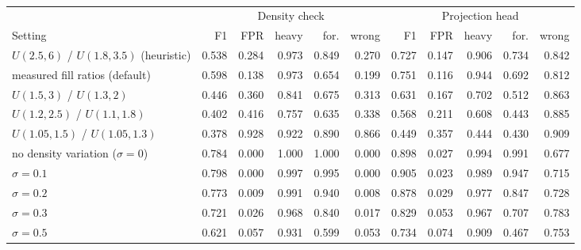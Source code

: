 \begin{table}[tb]
\centering
\caption{}
\label{tab:sensitivity}
\scriptsize
\setlength{\tabcolsep}{2.2pt}
\begin{tabular}{lrrrrrrrrrr}
\toprule
 & \multicolumn{5}{c}{Density check} & \multicolumn{5}{c}{Projection head} \\
\cmidrule(lr){2-6}\cmidrule(lr){7-11}
Setting & F1 & FPR & heavy & for. & wrong & F1 & FPR & heavy & for. & wrong \\
\midrule
$U(2.5,6)$ / $U(1.8,3.5)$ (heuristic) & 0.538 & 0.284 & 0.973 & 0.849 & 0.270 & 0.727 & 0.147 & 0.906 & 0.734 & 0.842 \\
measured fill ratios (default) & 0.598 & 0.138 & 0.973 & 0.654 & 0.199 & 0.751 & 0.116 & 0.944 & 0.692 & 0.812 \\
$U(1.5,3)$ / $U(1.3,2)$ & 0.446 & 0.360 & 0.841 & 0.675 & 0.313 & 0.631 & 0.167 & 0.702 & 0.512 & 0.863 \\
$U(1.2,2.5)$ / $U(1.1,1.8)$ & 0.402 & 0.416 & 0.757 & 0.635 & 0.338 & 0.568 & 0.211 & 0.608 & 0.443 & 0.885 \\
$U(1.05,1.5)$ / $U(1.05,1.3)$ & 0.378 & 0.928 & 0.922 & 0.890 & 0.866 & 0.449 & 0.357 & 0.444 & 0.430 & 0.909 \\
\midrule
no density variation ($\sigma=0$) & 0.784 & 0.000 & 1.000 & 1.000 & 0.000 & 0.898 & 0.027 & 0.994 & 0.991 & 0.677 \\
$\sigma=0.1$ & 0.798 & 0.000 & 0.997 & 0.995 & 0.000 & 0.905 & 0.023 & 0.989 & 0.947 & 0.715 \\
$\sigma=0.2$ & 0.773 & 0.009 & 0.991 & 0.940 & 0.008 & 0.878 & 0.029 & 0.977 & 0.847 & 0.728 \\
$\sigma=0.3$ & 0.721 & 0.026 & 0.968 & 0.840 & 0.017 & 0.829 & 0.053 & 0.967 & 0.707 & 0.783 \\
$\sigma=0.5$ & 0.621 & 0.057 & 0.931 & 0.599 & 0.053 & 0.734 & 0.074 & 0.909 & 0.467 & 0.753 \\
\bottomrule
\end{tabular}
\end{table}
